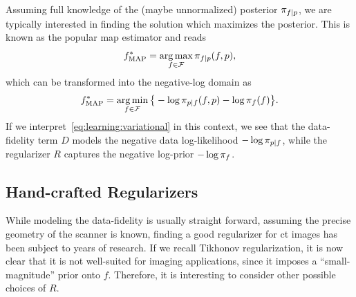 \documentclass[../ml-ct.tex]{subfiles}
\begin{document}
Assuming full knowledge of the (maybe unnormalized) posterior \( \pi_{f \mid p} \), we are typically interested in finding the solution which maximizes the posterior.
This is known as the popular \gls{map} estimator and reads
\begin{equation}
	\optimal{f}{MAP} = \argmax_{f \in \set{F}} \pdf{f \mid p}(f, p),%
	\label{eq:learning:map}
\end{equation}
which can be transformed into the negative-log domain as
\begin{equation}
	\optimal{f}{MAP} = \argmin_{f \in \set{F}} \big\{ -\log \pdf{p \mid f}(f, p) -\log\pdf{f}(f) \big\}.%
	\label{eq:learning:map neg log}
\end{equation}
If we interpret~\cref{eq:learning:variational} in this context, we see that the data-fidelity term \( D \) models the negative data log-likelihood \( -\log\pi_{p \mid f} \), while the regularizer \( R \) captures the negative log-prior \( -\log\pi_{f} \).

\subsection{Hand-crafted Regularizers}
While modeling the data-fidelity is usually straight forward, assuming the precise geometry of the scanner is known, finding a good regularizer for \gls{ct} images has been subject to years of research.
If we recall Tikhonov regularization, it is now clear that it is not well-suited for imaging applications, since it imposes a \enquote{small-magnitude} prior onto \( f \).
Therefore, it is interesting to consider other possible choices of \( R \).
\end{document}
